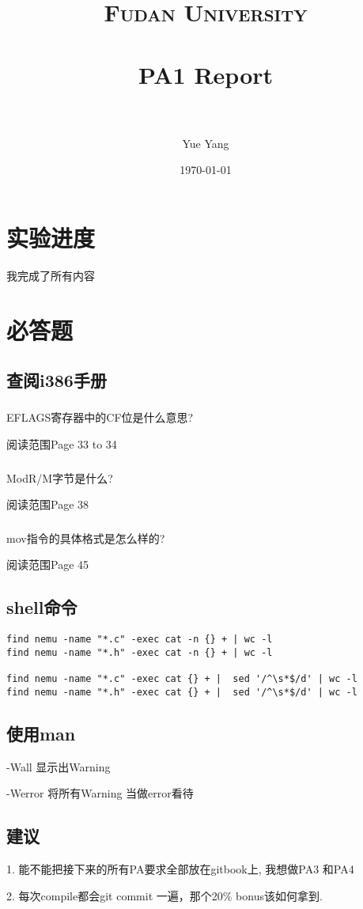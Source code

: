\documentclass[paper=a4, fontsize=11pt]{scrartcl} %
\title{	
\normalfont \normalsize 
\textsc{Fudan University} \\ [25pt] %
\horrule{0.5pt} \\[0.4cm] %
\huge PA1 Report \\ %
\horrule{2pt} \\[0.5cm] %
}
\author{Yue Yang} %
\date{\normalsize\today} %
\numberwithin{equation}{section} %
\numberwithin{figure}{section} %
\numberwithin{table}{section} %
\begin{document}
\maketitle %


\section*{实验进度}
我完成了所有内容

\section*{必答题}

\subsection*{查阅i386手册}

\subsubsection*{}
EFLAGS寄存器中的CF位是什么意思?

阅读范围Page 33 to 34

\subsubsection*{}
ModR/M字节是什么?

阅读范围Page 38

\subsubsection*{}
mov指令的具体格式是怎么样的?

阅读范围Page 45

\subsection*{shell命令}

\begin{verbatim}
find nemu -name "*.c" -exec cat -n {} + | wc -l
find nemu -name "*.h" -exec cat -n {} + | wc -l

find nemu -name "*.c" -exec cat {} + |  sed '/^\s*$/d' | wc -l
find nemu -name "*.h" -exec cat {} + |  sed '/^\s*$/d' | wc -l
\end{verbatim}

\subsection*{使用man}
-Wall 显示出Warning

-Werror 将所有Warning 当做error看待

\subsection*{建议}
1. 能不能把接下来的所有PA要求全部放在gitbook上, 我想做PA3 和PA4

2. 每次compile都会git commit 一遍，那个20\% bonus该如何拿到.
\end{document}

